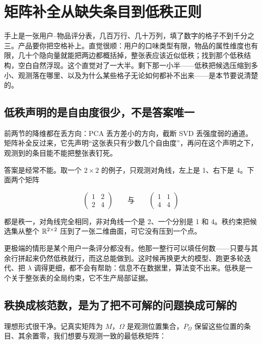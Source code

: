 \section{矩阵补全从缺失条目到低秩正则}
\label{sec:13-Machine-Learning/04-Dimensionality-Reduction/03}

手上是一张用户--物品评分表，几百万行、几十万列，填了数字的格子不到千分之三。产品要你把空格补上。直觉很顺：用户的口味类型有限，物品的属性维度也有限，几十个隐向量就能把两边都概括掉，整张表应该近似低秩；找到那个低秩结构，空白自然浮现。这个直觉对了一大半。剩下那一小半——低秩把候选压缩到多小、观测落在哪里、以及为什么某些格子无论如何都补不出来——是本节要说清楚的。

\subsection{低秩声明的是自由度很少，不是答案唯一}

前两节的降维都在丢方向：PCA 丢方差小的方向，截断 SVD 丢强度弱的通道。矩阵补全反过来，它先声明``这张表只有少数几个自由度''，再问在这个声明之下，观测到的条目能不能把整张表钉死。

答案是经常不能。取一个 \(2\times2\) 的例子，只观测对角线，左上是 1、右下是 4。下面两个矩阵

\[
\begin{pmatrix}1&2\\2&4\end{pmatrix}
\qquad\text{与}\qquad
\begin{pmatrix}1&1\\4&4\end{pmatrix}
\]

都是秩一，对角线完全相同，非对角线一个是 2、一个分别是 1 和 4。秩约束把候选集从整个 \(\mathbb{R}^{2\times 2}\) 压到了一张二维曲面，可它没有压到一个点。

更极端的情形是某个用户一条评分都没有。他那一整行可以填任何数——只要与其余行拼起来仍然低秩就行，而这总能做到。这时候再换更大的模型、跑更多轮迭代、把 \(\lambda\) 调得更细，都不会有帮助：信息不在数据里，算法变不出来。低秩是一个关于整张表的全局约束，它不生产局部证据。

\subsection{秩换成核范数，是为了把不可解的问题换成可解的}

理想形式很干净。记真实矩阵为 \(M\)，\(\Omega\) 是观测位置集合，\(P_\Omega\) 保留这些位置的条目、其余置零，我们想要与观测一致的最低秩矩阵：

